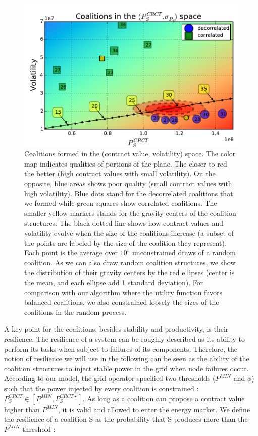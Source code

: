 \documentclass[conference]{IEEEtran}
\begin{document}
\begin{figure}
\includegraphics[scale=.6]{./figures/coalitions/coalitions6.pdf}
\caption{Coalitions formed in the (contract value, volatility) space. The color map indicates qualities of portions of the plane. The closer to red the better (high contract values with small volatility). On the opposite, blue areas shows poor quality (small contract values with high volatility). Blue dots stand for the decorrelated coalitions that we formed while green squares show correlated coalitions. The smaller yellow markers stands for the gravity centers of the coalition structures. The black dotted line shows how contract values and volatility evolve  when the size of the coalitions increase (a subset of the points are labeled by the size of the coalition they represent). Each point is the average over $ 10^{5} $ unconstrained draws of a random coalition. As we can also draw random coalition structures, we show the distribution of their gravity centers by the red ellipses (center is the mean, and each ellipse add 1 standard deviation). For comparison with our algorithm where the utility function favors balanced coalitions, we also constrained loosely the sizes of the coalitions in the random process. }
\label{fig:coalitions}
\end{figure}

A key point for the coalitions, besides stability and productivity, is their resilience. The resilience of a system can be roughly described as its ability to perform its tasks when subject to failures of its components. Therefore, the notion of resilience we will use in the following can be seen as the ability of the coalition structures to inject stable power in the grid when node failures occur. According to our model, the grid operator specified two thresholds ($P^{MIN}$ and $ \phi $) such that the power injected by every coalition is constrained : $ P_{S}^{CRCT} \in [P^{MIN}, P_{S}^{CRCT \star}] $. As long as a coalition can propose a contract value higher than $ P^{MIN} $, it is valid and allowed to enter the energy market. We define the resilience of a coalition S as the probability that S produces more than the $ P^{MIN} $ threshold :
\end{document}
